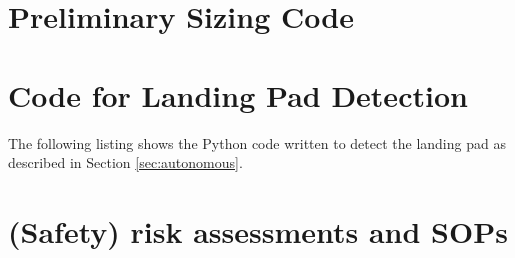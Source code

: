\begin{appendices}
\newpage


\section{Preliminary Sizing Code}
\label{appendixcalcs}


\newpage

\section{Code for Landing Pad Detection}

The following listing shows the Python code written to detect the landing pad as described in Section \ref{sec:autonomous}.



\section{(Safety) risk assessments and SOPs}

\end{appendices}

